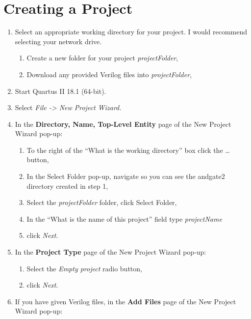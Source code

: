 \chapter{Creating a Project}
\graphicspath{ {./Lab00HowTo/howTo10 Create Project/Fig} }

\begin{enumerate}
        \def\labelenumi{\arabic{enumi}.}
    \item
        Select an appropriate working directory for your project. I would
        recommend selecting your network drive.

        \begin{enumerate}
                \def\labelenumii{\alph{enumii}.}
            \item
                Create a new folder for your project \emph{projectFolder},
            \item
                Download any provided Verilog files into \emph{projectFolder},
        \end{enumerate}
    \item
        Start Quartus II 18.1 (64-bit).
    \item
        Select \emph{File -\textgreater{} New Project Wizard.}
    \item
        In the \textbf{Directory, Name, Top-Level Entity} page of the New
        Project Wizard pop-up:

        \begin{enumerate}
                \def\labelenumii{\alph{enumii}.}
            \item
                To the right of the ``What is the working directory'' box click the
                \ldots{} button,
            \item
                In the Select Folder pop-up, navigate so you can see the andgate2
                directory created in step 1,
            \item
                Select the \emph{projectFolder} folder, click Select Folder,
            \item
                In the ``What is the name of this project'' field type
                \emph{projectName}
            \item
                click \emph{Next}.
        \end{enumerate}
    \item
        In the \textbf{Project Type} page of the New Project Wizard pop-up:

        \begin{enumerate}
                \def\labelenumii{\alph{enumii}.}
            \item
                Select the \emph{Empty project} radio button,
            \item
                click \emph{Next}.
        \end{enumerate}
    \item
        If you have given Verilog files, in the \textbf{Add Files} page of the
        New Project Wizard pop-up:


\end{enumerate}

